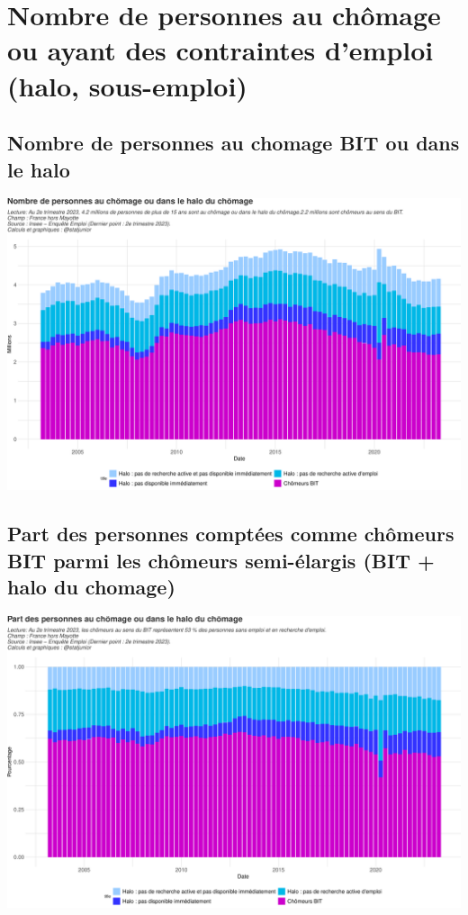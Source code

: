 \documentclass[
  paper=a4,
  ,captions=tableheading
]{scrartcl}
\begin{document}
\newpage

\hypertarget{nombre-de-personnes-au-chuxf4mage-ou-ayant-des-contraintes-demploi-halo-sous-emploi}{%
\section{Nombre de personnes au chômage ou ayant des contraintes
d'emploi (halo,
sous-emploi)}\label{nombre-de-personnes-au-chuxf4mage-ou-ayant-des-contraintes-demploi-halo-sous-emploi}}

\hypertarget{nombre-de-personnes-au-chomage-bit-ou-dans-le-halo}{%
\subsection{Nombre de personnes au chomage BIT ou dans le
halo}\label{nombre-de-personnes-au-chomage-bit-ou-dans-le-halo}}

\includegraphics{rapport_activite_emploi_chomage_insee_files/figure-latex/unnamed-chunk-23-1.pdf}

\hypertarget{part-des-personnes-comptuxe9es-comme-chuxf4meurs-bit-parmi-les-chuxf4meurs-semi-uxe9largis-bit-halo-du-chomage}{%
\subsection{Part des personnes comptées comme chômeurs BIT parmi les
chômeurs semi-élargis (BIT + halo du
chomage)}\label{part-des-personnes-comptuxe9es-comme-chuxf4meurs-bit-parmi-les-chuxf4meurs-semi-uxe9largis-bit-halo-du-chomage}}

\includegraphics{rapport_activite_emploi_chomage_insee_files/figure-latex/unnamed-chunk-24-1.pdf}
\end{document}
